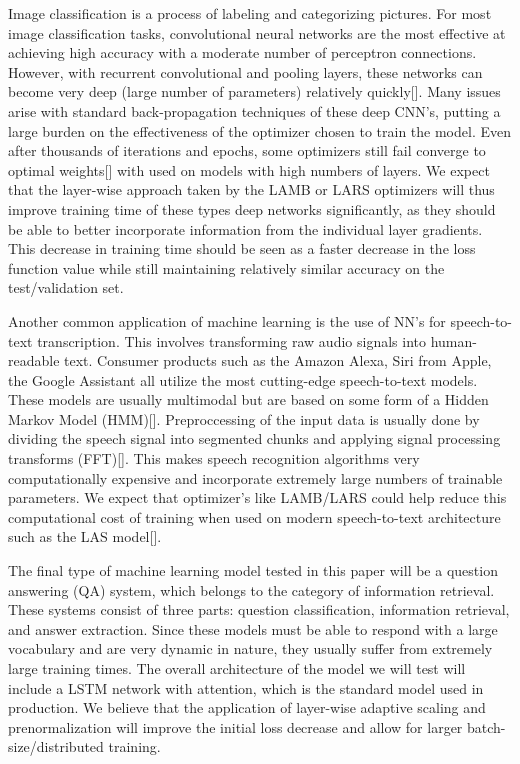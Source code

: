 Image classification is a process of labeling and categorizing pictures. For most image classification tasks, convolutional neural networks are the most effective at achieving high accuracy with a moderate number of perceptron connections. However, with recurrent convolutional and pooling layers, these networks can become very deep (large number of parameters) relatively quickly[]. Many issues arise with standard back-propagation techniques of these deep CNN's, putting a large burden on the effectiveness of the optimizer chosen to train the model. Even after thousands of iterations and epochs, some optimizers still fail converge to optimal weights[] with used on models with high numbers of layers. We expect that the layer-wise approach taken by the LAMB or LARS optimizers will thus improve training time of these types deep networks significantly, as they should be able to better incorporate information from the individual layer gradients. This decrease in training time should be seen as a faster decrease in the loss function value while still maintaining relatively similar accuracy on the test/validation set.

Another common application of machine learning is the use of NN's for speech-to-text transcription. This involves transforming raw audio signals into human-readable text. Consumer products such as the Amazon Alexa, Siri from Apple, the Google Assistant all utilize the most cutting-edge speech-to-text models. These models are usually multimodal but are based on some form of a Hidden Markov Model (HMM)[]. Preproccessing of the input data is usually done by dividing the speech signal into segmented chunks and applying signal processing transforms (FFT)[]. This makes speech recognition algorithms very computationally expensive and incorporate extremely large numbers of trainable parameters. We expect that optimizer's like LAMB/LARS could help reduce this computational cost of training when used on modern speech-to-text architecture such as the LAS model[].

The final type of machine learning model tested in this paper will be a question answering (QA) system, which belongs to the category of information retrieval. These systems consist of three parts: question classification, information retrieval, and answer extraction. Since these models  must be able to respond with a large vocabulary and are very dynamic in nature, they usually suffer from extremely large training times. The overall architecture of the model we will test will include a LSTM network with attention, which is the standard model used in production. We believe that the application of layer-wise adaptive scaling and prenormalization will improve the initial loss decrease and allow for larger batch-size/distributed training.\\






